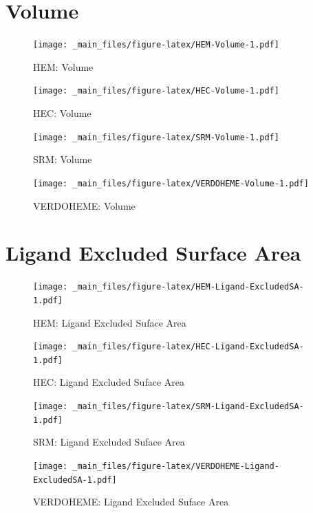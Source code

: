 \documentclass[a4paper, nobind]{templates/ociamthesis}
\begin{document}
\hypertarget{figs-vol}{%
\section{Volume}\label{figs-vol}}

\begin{figure}
\centering
\texttt{[image: \_main\_files/figure-latex/HEM-Volume-1.pdf]}
\caption{\label{fig:HEM-Volume}HEM: Volume}
\end{figure}

\begin{figure}
\centering
\texttt{[image: \_main\_files/figure-latex/HEC-Volume-1.pdf]}
\caption{\label{fig:HEC-Volume}HEC: Volume}
\end{figure}

\begin{figure}
\centering
\texttt{[image: \_main\_files/figure-latex/SRM-Volume-1.pdf]}
\caption{\label{fig:SRM-Volume}SRM: Volume}
\end{figure}

\begin{figure}
\centering
\texttt{[image: \_main\_files/figure-latex/VERDOHEME-Volume-1.pdf]}
\caption{\label{fig:VERDOHEME-Volume}VERDOHEME: Volume}
\end{figure}

\hypertarget{figs-ligExcSA}{%
\section{Ligand Excluded Surface Area}\label{figs-ligExcSA}}

\begin{figure}
\centering
\texttt{[image: \_main\_files/figure-latex/HEM-Ligand-ExcludedSA-1.pdf]}
\caption{\label{fig:HEM-Ligand-ExcludedSA}HEM: Ligand Excluded Suface Area}
\end{figure}

\begin{figure}
\centering
\texttt{[image: \_main\_files/figure-latex/HEC-Ligand-ExcludedSA-1.pdf]}
\caption{\label{fig:HEC-Ligand-ExcludedSA}HEC: Ligand Excluded Suface Area}
\end{figure}

\begin{figure}
\centering
\texttt{[image: \_main\_files/figure-latex/SRM-Ligand-ExcludedSA-1.pdf]}
\caption{\label{fig:SRM-Ligand-ExcludedSA}SRM: Ligand Excluded Suface Area}
\end{figure}

\begin{figure}
\centering
\texttt{[image: \_main\_files/figure-latex/VERDOHEME-Ligand-ExcludedSA-1.pdf]}
\caption{\label{fig:VERDOHEME-Ligand-ExcludedSA}VERDOHEME: Ligand Excluded Suface Area}
\end{figure}
\end{document}
